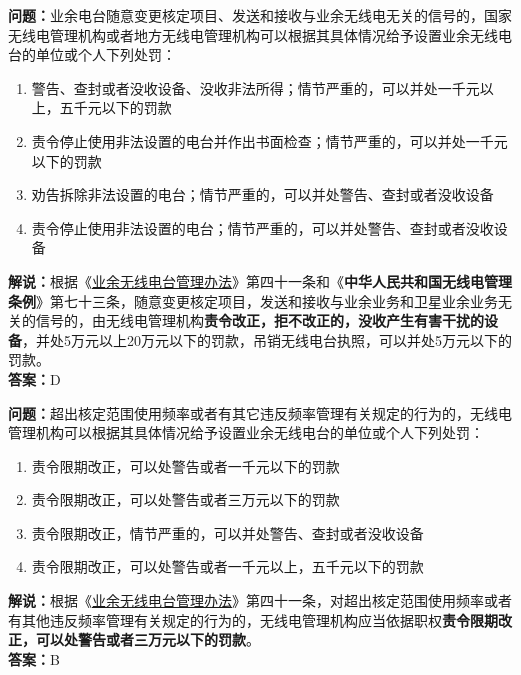 \textbf{问题：}业余电台随意变更核定项目、发送和接收与业余无线电无关的信号的，国家无线电管理机构或者地方无线电管理机构可以根据其具体情况给予设置业余无线电台的单位或个人下列处罚：
\begin{enumerate}[label=\Alph*), leftmargin=1.5cm]
	\item  警告、查封或者没收设备、没收非法所得；情节严重的，可以并处一千元以上，五千元以下的罚款
	\item  责令停止使用非法设置的电台并作出书面检查；情节严重的，可以并处一千元以下的罚款
	\item  劝告拆除非法设置的电台；情节严重的，可以并处警告、查封或者没收设备
	\item  责令停止使用非法设置的电台；情节严重的，可以并处警告、查封或者没收设备
\end{enumerate}
\textbf{解说：}根据《\href{https://www.miit.gov.cn/jgsj/zfs/bmgz/art/2020/art_147b69815b3641caad9047735f94c860.html}{业余无线电台管理办法}》第四十一条和《\textbf{中华人民共和国无线电管理条例}》第七十三条，随意变更核定项目，发送和接收与业余业务和卫星业余业务无关的信号的，由无线电管理机构\textbf{责令改正，拒不改正的，没收产生有害干扰的设备}，并处5万元以上20万元以下的罚款，吊销无线电台执照，可以并处5万元以下的罚款。\\
\textbf{答案：}D


\textbf{问题：}超出核定范围使用频率或者有其它违反频率管理有关规定的行为的，无线电管理机构可以根据其具体情况给予设置业余无线电台的单位或个人下列处罚：
\begin{enumerate}[label=\Alph*), leftmargin=1.5cm]
  \item 责令限期改正，可以处警告或者一千元以下的罚款
  \item 责令限期改正，可以处警告或者三万元以下的罚款
  \item 责令限期改正，情节严重的，可以并处警告、查封或者没收设备
  \item 责令限期改正，可以处警告或者一千元以上，五千元以下的罚款
\end{enumerate}
\textbf{解说：}根据《\href{https://www.miit.gov.cn/jgsj/zfs/bmgz/art/2020/art_147b69815b3641caad9047735f94c860.html}{业余无线电台管理办法}》第四十一条，对超出核定范围使用频率或者有其他违反频率管理有关规定的行为的，无线电管理机构应当依据职权\textbf{责令限期改正，可以处警告或者三万元以下的罚款}。\\
\textbf{答案：}B



